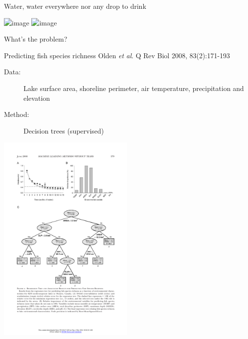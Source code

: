 \documentclass[pdf]{beamer}
\begin{document}
\begin{frame}{Water, water everywhere nor any drop to drink}
\begin{center}	
	\includegraphics<1>[width=0.95\textwidth]{bigDataCartoon.jpg}
	\includegraphics<2>[width=0.95\textwidth]{pulpFiction.jpg}
\end{center}
\end{frame}
\begin{frame}{What's the problem?}
\begin{exampleblock}{Predicting fish species richness \vskip-1mm{\tiny Olden \textit{et al}. Q Rev Biol 2008, 83(2):171-193}}
\begin{description}
	\item[Data:] Lake surface area, shoreline perimeter, air temperature, precipitation and elevation
	\item[Method:] Decision trees (supervised)
\end{description}
\begin{center}
	\includegraphics[width=0.5\textwidth]{olden.pdf}
\end{center}
\end{exampleblock}
\end{frame}
\end{document}
